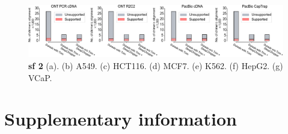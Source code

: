 \documentclass[pdflatex, sn-mathphys-num, lineno]{sn-jnl}%
\theoremstyle{thmstyleone}%
\theoremstyle{thmstyletwo}%
\theoremstyle{thmstylethree}%
\begin{document}
 \begin{figure}[!h]
     \includegraphics[height=1.2\columnwidth]{figures/finals/sf2}
     \caption{ {\bf  sf 2 } (a). (b) A549. (c) HCT116. (d) MCF7. (e) K562. (f) HepG2. (g) VCaP.}
     \label{fig:sf2}
 \end{figure}




\newpage

\section{Supplementary information}

\renewcommand{\figurename}{Supplementary Fig.}
\renewcommand{\tablename}{Supplementary Table}


\end{document}
